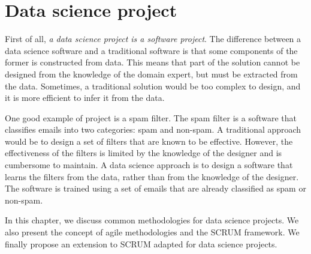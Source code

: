 \chapter{Data science project}
\label{chap:project}



First of all, \emph{a data science project is a software project}.  The difference between a data
science software and a traditional software is that some components of the former is
constructed from data.  This means that part of the solution cannot be designed from the
knowledge of the domain expert, but must be extracted from the data.  Sometimes, a
traditional solution would be too complex to design, and it is more efficient to infer it
from the data.

One good example of project is a spam filter.  The spam filter is a software that
classifies emails into two categories: spam and non-spam.  A traditional approach would be
to design a set of filters that are known to be effective.  However, the effectiveness of
the filters is limited by the knowledge of the designer and is cumbersome to maintain.  A
data science approach is to design a software that learns the filters from the data,
rather than from the knowledge of the designer.  The software is trained using a set of
emails that are already classified as spam or non-spam.

In this chapter, we discuss common methodologies for data science projects.  We also
present the concept of agile methodologies and the SCRUM framework.  We finally propose an
extension to SCRUM adapted for data science projects.


